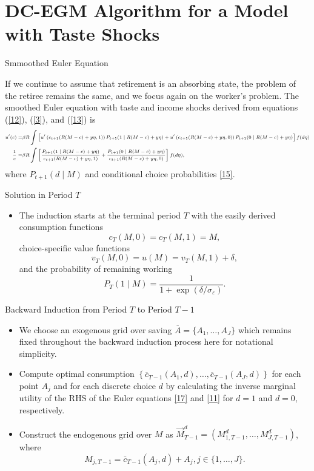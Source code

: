 \documentclass[aspectratio=169]{beamer}
\begin{document}
\section[DC-EGM with Taste Shocks]{DC-EGM Algorithm for a Model with Taste Shocks}

\begin{frame}{Smmoothed Euler Equation}

	 If we continue to assume that retirement is an absorbing state, the problem of the retiree remains the same, and we focus again on the worker's problem.
	 The smoothed Euler equation with taste and income shocks derived from equations (\ref{12}), (\ref{3}), and (\ref{13}) is 
	\begin{equation} \scriptsize
		\label{17}
		\begin{aligned}
			u^{\prime}(c)= & \beta R \int \left[u^{\prime}\left(c_{t+1}(R(M-c)+y \eta, 1)\right) P_{t+1}(1 \mid R(M-c)+y \eta)+  u^{\prime}\left(c_{t+1}(R(M-c)+y \eta, 0)\right) P_{t+1}(0 \mid R(M-c)+y \eta)\right] f(d \eta) \\
			\frac{1}{c}= & \beta R \int\left[\frac{P_{t+1}(1 \mid R(M-c)+y \eta)}{c_{t+1}(R(M-c)+y \eta, 1)}+\frac{P_{t+1}(0 \mid R(M-c)+y \eta)}{c_{t+1}(R(M-c)+y \eta, 0)}\right] f(d \eta),
		\end{aligned}
	\end{equation}
	where $P_{t+1}(d \mid M)$ and conditional choice probabilities \ref{15}.

\end{frame}

\begin{frame}{Solution in Period $T$}
	\begin{itemize}
		\item The induction starts at the terminal period $T$ with the easily derived consumption functions $$c_T(M,0) = c_T(M, 1) = M, $$ choice-specific value functions $$v_T(M, 0) = u(M) = v_T(M,1) + \delta, $$ and the probability of remaining working $$P_{T}(1 \mid M) = \frac{1}{1 + \exp (\delta / \sigma_\varepsilon)}.$$
	\end{itemize}
\end{frame}

\begin{frame}{Backward Induction from Period $T$ to Period $T-1$}
	\begin{itemize}
		\item We choose an exogenous grid over saving $\overline{A} = \{A_1, \ldots, A_J\}$ which remains fixed throughout the backward induction process here for notational simplicity. 
		\item Compute optimal consumption $\left\{ \overline{c}_{T-1} (A_1, d), \ldots, \overline{c}_{T-1}(A_J, d) \right\}$ for each point $A_j$ and for each discrete choice $d$ by calculating the inverse marginal utility of the RHS of the Euler equations \ref{17} and \ref{11} for $d=1$ and $d=0$, respectively.
		\item Construct the endogenous grid over $M$ as $\overrightarrow{M}_{T-1}^d = ({M}_{1, T-1}^d, \ldots, {M}_{J, T-1}^d)$, where $$M_{j, T-1} = \overline{c}_{T-1}(A_j, d) + A_j, j \in \{1, \ldots, J\}.$$
	\end{itemize}
\end{frame}
\end{document}

